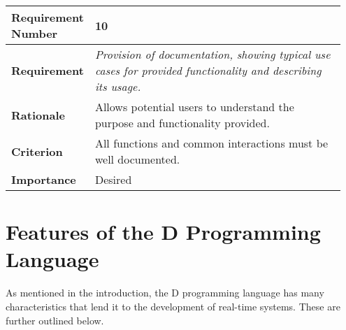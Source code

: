 \begin{table}[!h]
\centering
\begin{tabular}{|L{0.2\linewidth}|L{0.75\linewidth}|}
\hline
\textbf{Requirement Number} & 10 \\ \hline
\textbf{Requirement} & \emph{Provision of documentation, showing typical use cases for provided 
                functionality and describing its usage.} \\ \hline
\textbf{Rationale}      & Allows potential users to understand the purpose and 
                functionality provided. \\ \hline
\textbf{Criterion}      & All functions and common interactions must be well documented. \\ \hline
\textbf{Importance}     & Desired \\ \hline
\end{tabular}
\end{table}
\FloatBarrier
\section{Features of the D Programming Language}
As mentioned in the introduction, the D programming language has many 
characteristics that lend it to the development of real-time systems.
These are further outlined below.

